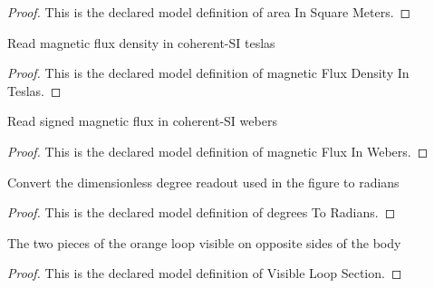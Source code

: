 \begin{proof}
  This is the declared model definition of area In Square Meters.
\end{proof}
\begin{definition}
  \label{def:physics:phyx-mini-0925:phyxminiproblems-problemphyxmini0925-magneticfluxdensityinteslas}
  Read magnetic flux density in coherent-SI teslas
\end{definition}
\begin{proof}
  This is the declared model definition of magnetic Flux Density In Teslas.
\end{proof}
\begin{definition}
  \label{def:physics:phyx-mini-0925:phyxminiproblems-problemphyxmini0925-magneticfluxinwebers}
  Read signed magnetic flux in coherent-SI webers
\end{definition}
\begin{proof}
  This is the declared model definition of magnetic Flux In Webers.
\end{proof}
\begin{definition}
  \label{def:physics:phyx-mini-0925:phyxminiproblems-problemphyxmini0925-degreestoradians}
  Convert the dimensionless degree readout used in the figure to radians
\end{definition}
\begin{proof}
  This is the declared model definition of degrees To Radians.
\end{proof}
\begin{definition}
  \label{def:physics:phyx-mini-0925:phyxminiproblems-problemphyxmini0925-visibleloopsection}
  The two pieces of the orange loop visible on opposite sides of the body
\end{definition}
\begin{proof}
  This is the declared model definition of Visible Loop Section.
\end{proof}
